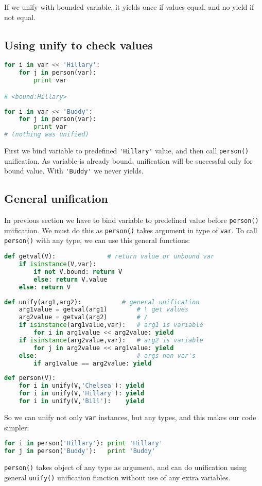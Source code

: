 If we unify with bounded variable, it yields once if values equal,
and no yield if not equal.

\subsection{Using unify to check values}

\begin{lstlisting}[language=Python]
for i in var << 'Hillary':
	for j in person(var):
		print var

# <bound:Hillary>
\end{lstlisting}
\begin{lstlisting}[language=Python]
for i in var << 'Buddy':
	for j in person(var):
		print var
# (nothing was unified)
\end{lstlisting}
First we bind variable to predefined \verb|'Hillary'| value, and then 
call \verb|person()| unification. As variable is already bound, unification
will be successful only for bound value. With \verb|'Buddy'| we never yields.

\subsection{General unification}

In previous section we have to bind variable to predefined value before
\verb|person()| unification. We must do this as \verb|person()| takes argument
in type of \verb|var|. To call \verb|person()| with any type, we can use
this general functions:

\begin{lstlisting}[language=Python]
def getval(V):				# return value or unbound var
	if isinstance(V,var):
		if not V.bound: return V
		else: return V.value
	else: return V
\end{lstlisting}
\begin{lstlisting}[language=Python]
def unify(arg1,arg2):			# general unification
	arg1value = getval(arg1)		# \ get values
	arg2value = getval(arg2)		# /
	if isinstance(arg1value,var):	# arg1 is variable
		for i in arg1value << arg2value: yield
	if isinstance(arg2value,var):	# arg2 is variable
		for j in arg2value << arg1value: yield
	else:							# args non var's
		if arg1value == arg2value: yield
\end{lstlisting}
\begin{lstlisting}[language=Python]
def person(V):
	for i in unify(V,'Chelsea'): yield
	for i in unify(V,'Hillary'): yield
	for i in unify(V,'Bill'):    yield
\end{lstlisting}
So we can unify not only \verb|var| instances, but any types, and this
makes our code simpler:
\begin{lstlisting}[language=Python]
for i in person('Hillary'): print 'Hillary'
for j in person('Buddy'):   print 'Buddy'
\end{lstlisting}
\verb|person()| takes object of any type as argument, and can do unification 
using general \verb|unify()| unification function without use of any extra
variables.

